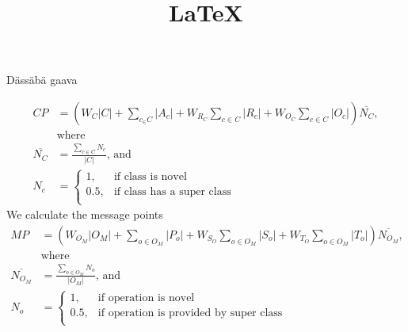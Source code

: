 \documentclass[12pt]{article}
\title{\LaTeX}
\date{}
\begin{document}
  \maketitle 
  Dässäbä gaava
 
  \begin{align}
  CP &= \left(W_C |C| + \sum_{c_ \in C} |A_c| + W_{R_C} \sum_{c \in C} |R_c| + W_{O_C} \sum_{c \in C} |O_c| \right) \overline{N_C},\\ &\text{where}\\
  \overline{N_C} &= \frac{\sum_{c \in C} N_c}{|C|},\, \text{and}\\
  N_c &=
 \begin{cases}
 1,& \text{if class is novel}\\
 0.5,& \text{if class has a super class}\\
 \end{cases}
 \end{align}
 We calculate the message points
 \begin{align}
 MP &= \left(W_{O_M} |O_M| + \sum_{o \in O_M} |P_o| + W_{S_O} \sum_{o \in O_M} |S_o| + W_{T_O} \sum_{o \in O_M} |T_o| \right) \overline{N_{O_M}},\\ &\text{where}\\
 \overline{N_{O_M}} &= \frac{\sum_{o \in O_M} N_o}{|O_M|},\,\text{and}\\
 N_o &= 
 \begin{cases}
 1,& \text{if operation is novel}\\
 0.5,& \text{if operation is provided by super class}\\
 \end{cases}
 \end{align}
 
 
 
\end{document}
